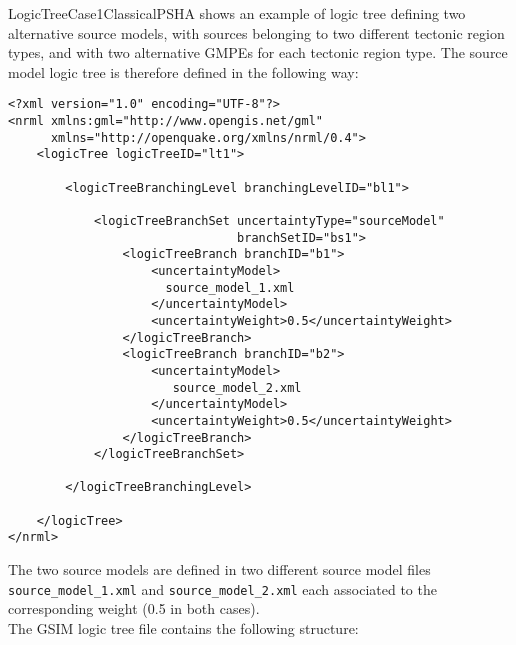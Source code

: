 LogicTreeCase1ClassicalPSHA shows an example of logic tree defining two alternative source models, with sources belonging to two different
tectonic region types, and with two alternative GMPEs for each tectonic region type.
The source model logic tree is therefore defined in the following way:
\begin{Verbatim}[frame=single, commandchars=\\\{\}, fontsize=\normalsize]
<?xml version="1.0" encoding="UTF-8"?>
<nrml xmlns:gml="http://www.opengis.net/gml"
      xmlns="http://openquake.org/xmlns/nrml/0.4">
    <logicTree logicTreeID="lt1">

        <logicTreeBranchingLevel branchingLevelID="bl1">

            <logicTreeBranchSet uncertaintyType="sourceModel"
                                branchSetID="bs1">
                <logicTreeBranch branchID="b1">
                    <uncertaintyModel>
                      source_model_1.xml
                    </uncertaintyModel>
                    <uncertaintyWeight>0.5</uncertaintyWeight>
                </logicTreeBranch>
                <logicTreeBranch branchID="b2">
                    <uncertaintyModel>
                       source_model_2.xml
                    </uncertaintyModel>
                    <uncertaintyWeight>0.5</uncertaintyWeight>
                </logicTreeBranch>
            </logicTreeBranchSet>

        </logicTreeBranchingLevel>

    </logicTree>
</nrml>
\end{Verbatim}
The two source models are defined in two different source model files \texttt{source\_\-model\_\-1.xml} and \texttt{source\_\-model\_\-2.xml} each
associated to the corresponding weight (0.5 in both cases).\\
The GSIM logic tree file contains the following structure:
